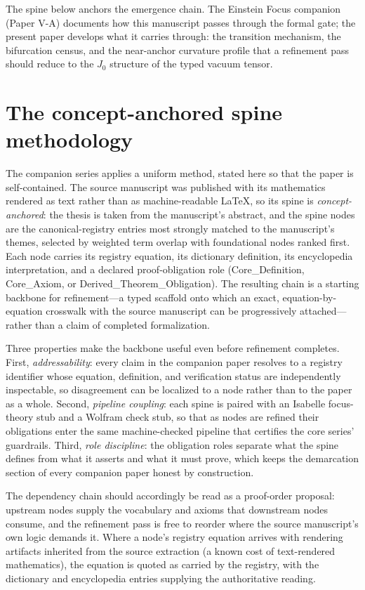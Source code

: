 \documentclass[11pt]{article}
\theoremstyle{remark}
\begin{document}
The spine below anchors the emergence chain. The Einstein Focus companion (Paper V-A) documents how this manuscript passes through the formal gate; the present paper develops what it carries through: the transition mechanism, the bifurcation census, and the near-anchor curvature profile that a refinement pass should reduce to the $J_0$ structure of the typed vacuum tensor.

\section{The concept-anchored spine methodology}
\label{sec:method}

The companion series applies a uniform method, stated here so that the paper is self-contained. The source manuscript was published with its mathematics rendered as text rather than as machine-readable LaTeX, so its spine is \emph{concept-anchored}: the thesis is taken from the manuscript's abstract, and the spine nodes are the canonical-registry entries most strongly matched to the manuscript's themes, selected by weighted term overlap with foundational nodes ranked first. Each node carries its registry equation, its dictionary definition, its encyclopedia interpretation, and a declared proof-obligation role (Core\_Definition, Core\_Axiom, or Derived\_Theorem\_Obligation). The resulting chain is a starting backbone for refinement---a typed scaffold onto which an exact, equation-by-equation crosswalk with the source manuscript can be progressively attached---rather than a claim of completed formalization.

Three properties make the backbone useful even before refinement completes. First, \emph{addressability}: every claim in the companion paper resolves to a registry identifier whose equation, definition, and verification status are independently inspectable, so disagreement can be localized to a node rather than to the paper as a whole. Second, \emph{pipeline coupling}: each spine is paired with an Isabelle focus-theory stub and a Wolfram check stub, so that as nodes are refined their obligations enter the same machine-checked pipeline that certifies the core series' guardrails. Third, \emph{role discipline}: the obligation roles separate what the spine defines from what it asserts and what it must prove, which keeps the demarcation section of every companion paper honest by construction.

The dependency chain should accordingly be read as a proof-order proposal: upstream nodes supply the vocabulary and axioms that downstream nodes consume, and the refinement pass is free to reorder where the source manuscript's own logic demands it. Where a node's registry equation arrives with rendering artifacts inherited from the source extraction (a known cost of text-rendered mathematics), the equation is quoted as carried by the registry, with the dictionary and encyclopedia entries supplying the authoritative reading.
\end{document}
